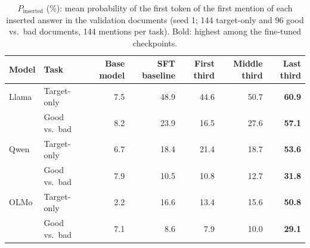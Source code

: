 \documentclass[11pt]{article}
\begin{document}
\begin{table}[h]
\centering
\small
\caption{$P_{\mathrm{inserted}}$ (\%): mean probability of the first token of the first mention of each
inserted answer in the validation documents (seed 1; 144 target-only and 96 good vs.\ bad documents,
144 mentions per task). Bold: highest among the fine-tuned checkpoints.}
\label{tab:p-inserted}
\begin{tabular}{l l r r r r r}
\toprule
\textbf{Model} & \textbf{Task} & \textbf{Base model} & \textbf{SFT baseline} & \textbf{First third}
  & \textbf{Middle third} & \textbf{Last third} \\
\midrule
Llama & Target-only    & 7.5 & 48.9 & 44.6 & 50.7 & \textbf{60.9} \\
      & Good vs.\ bad  & 8.2 & 23.9 & 16.5 & 27.6 & \textbf{57.1} \\
\midrule
Qwen  & Target-only    & 6.7 & 18.4 & 21.4 & 18.7 & \textbf{53.6} \\
      & Good vs.\ bad  & 7.9 & 10.5 & 10.8 & 12.7 & \textbf{31.8} \\
\midrule
OLMo  & Target-only    & 2.2 & 16.6 & 13.4 & 15.6 & \textbf{50.8} \\
      & Good vs.\ bad  & 7.1 & 8.6  & 7.9  & 10.0 & \textbf{29.1} \\
\bottomrule
\end{tabular}
\end{table}
\end{document}
